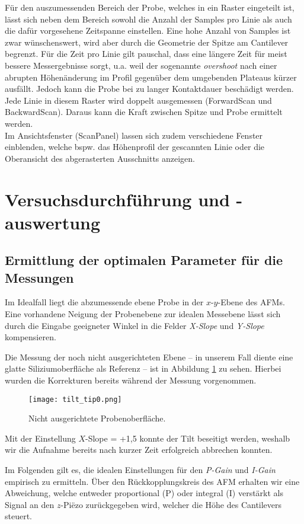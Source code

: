 Für den auszumessenden Bereich der Probe, welches in ein Raster eingeteilt ist, lässt sich neben dem Bereich sowohl die Anzahl der Samples pro Linie als auch die dafür vorgesehene Zeitspanne einstellen. Eine hohe Anzahl von Samples ist zwar wünschenswert, wird aber durch die Geometrie der Spitze am Cantilever begrenzt. Für die Zeit pro Linie gilt pauschal, dass eine längere Zeit für meist bessere Messergebnisse sorgt, u.a. weil der sogenannte \emph{overshoot} nach einer abrupten Höhenänderung im Profil gegenüber dem umgebenden Plateaus kürzer ausfällt. Jedoch kann die Probe bei zu langer Kontaktdauer beschädigt werden.\\
Jede Linie in diesem Raster wird doppelt ausgemessen (ForwardScan und BackwardScan). Daraus kann die Kraft zwischen Spitze und Probe ermittelt werden.\\
Im Ansichtsfenster (ScanPanel) lassen sich zudem verschiedene Fenster einblenden, welche bspw. das Höhenprofil der gescannten Linie oder die Oberansicht des abgerasterten Ausschnitts anzeigen.


\section{Versuchsdurchführung und -auswertung} 

\subsection{Ermittlung der optimalen Parameter für die Messungen}
Im Idealfall liegt die abzumessende ebene Probe in der $x$-$y$-Ebene des AFMs. Eine vorhandene Neigung der Probenebene zur idealen Messebene lässt sich durch die Eingabe geeigneter Winkel in die Felder \emph{X-Slope} und \emph{Y-Slope} kompensieren.

Die Messung der noch nicht ausgerichteten Ebene -- in unserem Fall diente eine glatte Siliziumoberfläche als Referenz -- ist in Abbildung \ref{fig:tilt} zu sehen. Hierbei wurden die Korrekturen bereits während der Messung vorgenommen.
\begin{figure}[h]
	\centering
	\texttt{[image: tilt\_tip0.png]}
	\caption{Nicht ausgerichtete Probenoberfläche.}
	\label{fig:tilt}
\end{figure}

Mit der Einstellung $X$-Slope = +1,5\degree{} konnte der Tilt beseitigt werden, weshalb wir die Aufnahme bereits nach kurzer Zeit erfolgreich abbrechen konnten.

Im Folgenden gilt es, die idealen Einstellungen für den \emph{P-Gain} und \emph{I-Gain} empirisch zu ermitteln. Über den Rückkopplungskreis des AFM erhalten wir eine Abweichung, welche entweder proportional (P) oder integral (I) verstärkt als Signal an den $z$-Pi\"{e}zo zurückgegeben wird, welcher die Höhe des Cantilevers steuert.


